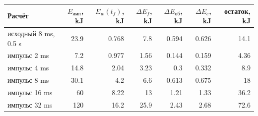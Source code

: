 \begin{tabular}{lrrrrrr}
\hline
Расчёт & $E_{\text{имп}}$, kJ & $E_w(t_f)$, kJ & $\Delta E_f$, kJ & $\Delta E_{\text{об}}$, kJ & $\Delta E_c$, kJ & остаток, kJ\\
\hline
исходный 8 ms, 0.5 s & 23.9 & 0.768 & 7.8 & 0.594 & 0.626 & 14.1\\
импульс 2 ms & 7.2 & 0.977 & 1.56 & 0.144 & 0.159 & 4.36\\
импульс 4 ms & 14.8 & 2.04 & 3.23 & 0.3 & 0.332 & 8.9\\
импульс 8 ms & 30.1 & 4.2 & 6.6 & 0.613 & 0.675 & 18\\
импульс 16 ms & 60 & 8.22 & 13 & 1.21 & 1.33 & 36.2\\
импульс 32 ms & 120 & 16.2 & 25.9 & 2.43 & 2.68 & 72.6\\
\hline
\end{tabular}
